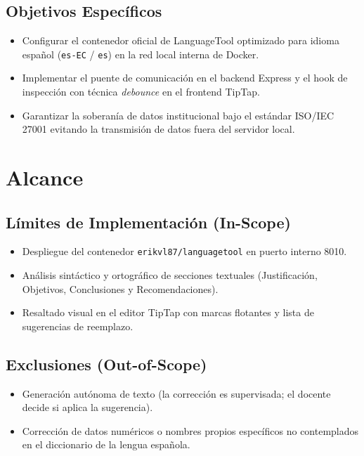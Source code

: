 \documentclass[12pt,a4paper]{article}
\begin{document}
\subsection{Objetivos Específicos}
\begin{itemize}[leftmargin=1.5em, itemsep=1.5pt]
    \item Configurar el contenedor oficial de LanguageTool optimizado para idioma español (\texttt{es-EC} / \texttt{es}) en la red local interna de Docker.
    \item Implementar el puente de comunicación en el backend Express y el hook de inspección con técnica \textit{debounce} en el frontend TipTap.
    \item Garantizar la soberanía de datos institucional bajo el estándar ISO/IEC 27001 evitando la transmisión de datos fuera del servidor local.
\end{itemize}

\section{Alcance}

\subsection{Límites de Implementación (In-Scope)}
\begin{itemize}[leftmargin=1.5em, itemsep=1.5pt]
    \item Despliegue del contenedor \texttt{erikvl87/languagetool} en puerto interno 8010.
    \item Análisis sintáctico y ortográfico de secciones textuales (Justificación, Objetivos, Conclusiones y Recomendaciones).
    \item Resaltado visual en el editor TipTap con marcas flotantes y lista de sugerencias de reemplazo.
\end{itemize}

\subsection{Exclusiones (Out-of-Scope)}
\begin{itemize}[leftmargin=1.5em, itemsep=1.5pt]
    \item Generación autónoma de texto (la corrección es supervisada; el docente decide si aplica la sugerencia).
    \item Corrección de datos numéricos o nombres propios específicos no contemplados en el diccionario de la lengua española.
\end{itemize}
\end{document}
